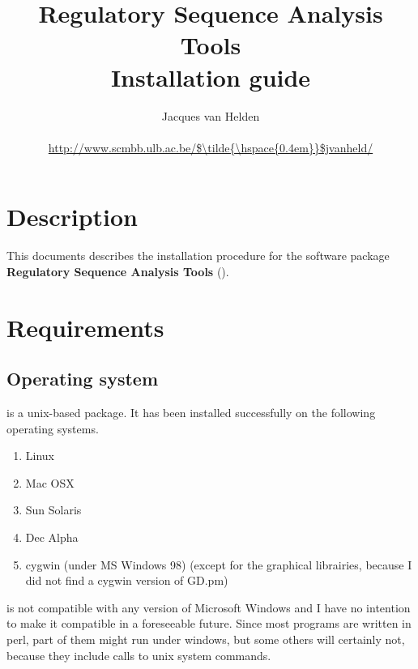 \documentclass{article}
\begin{document}
\title{Regulatory Sequence Analysis Tools \\
Installation guide}

\author{
	Jacques van Helden \\
	 \\
	\url{http://www.scmbb.ulb.ac.be/$\tilde{\hspace{0.4em}}$jvanheld/} \\
	\scmb 
}


\maketitle

\newpage
\tableofcontents
\newpage

\section{Description}

This documents describes the installation procedure for the software
package \textbf{Regulatory Sequence Analysis Tools} (\RSAT).

\section{Requirements}

\subsection{Operating system}

\RSAT is a unix-based package. It has been installed successfully on
the following operating systems.

\begin{enumerate}
\item Linux

\item Mac OSX

\item Sun Solaris

\item Dec Alpha

\item cygwin (under MS Windows 98) (except for the graphical
librairies, because I did not find a cygwin version of GD.pm)

\end{enumerate}

\RSAT is not compatible with any version of Microsoft Windows and I
have no intention to make it compatible in a foreseeable future. Since
most programs are written in perl, part of them might run under
windows, but some others will certainly not, because they include
calls to unix system commands.
\end{document}
